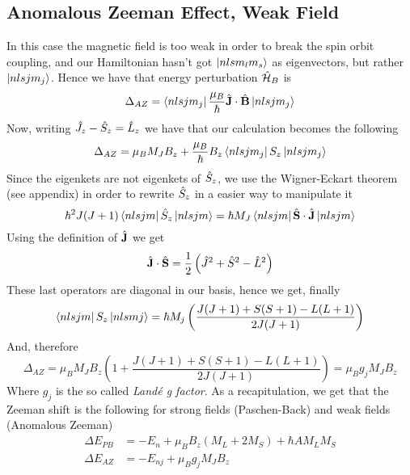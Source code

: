 \documentclass[../qm.tex]{subfiles}
\begin{document}
	\subsection{Anomalous Zeeman Effect, Weak Field}
	In this case the magnetic field is too weak in order to break the spin orbit coupling, and our Hamiltonian hasn't got $\ket{nlsm_lm_s}$ as eigenvectors, but rather $\ket{nlsjm_j}$. Hence we have that energy perturbation $\hat{\mathcal{H}}_B$ is
	\begin{equation*}
		\Delta_{AZ}=\bra{nlsjm_j}\frac{\mu_B}{\hbar}\hat{\mathbf{J}}\cdot\hat{\mathbf{B}}\ket{nlsjm_j}
	\end{equation*}
	Now, writing $\hat{J}_z-\hat{S}_z=\hat{L}_z$ we have that our calculation becomes the following
	\begin{equation*}
		\Delta_{AZ}=\mu_BM_JB_z+\frac{\mu_B}{\hbar}B_z\bra{nlsjm_j}S_z\ket{nlsjm_j}
	\end{equation*}
	Since the eigenkets are not eigenkets of $\hat{S}_z$, we use the Wigner-Eckart theorem (see appendix) in order to rewrite $\hat{S}_z$ in a easier way to manipulate it
	\begin{equation}
		\hbar^2J(J+1)\bra{nlsjm}\hat{S}_z\ket{nlsjm}=\hbar M_J\bra{nlsjm}\hat{\mathbf{S}}\cdot\hat{\mathbf{J}}\ket{nlsjm}
		\label{eq:wignereckart}
	\end{equation}
	Using the definition of $\hat{\mathbf{J}}$ we get
	\begin{equation*}
		\hat{\mathbf{J}}\cdot\hat{\mathbf{S}}=\frac{1}{2}\left( \hat{J}^2+\hat{S}^2-\hat{L}^2 \right)
	\end{equation*}
	These last operators are diagonal in our basis, hence we get, finally
	\begin{equation*}
		\bra{nlsjm}S_z\ket{nlsmj}=\hbar M_j\left( \frac{J(J+1)+S(S+1)-L(L+1)}{2J(J+1)} \right)
	\end{equation*}
	And, therefore
	\begin{equation}
		\Delta_{AZ}=\mu_BM_JB_z\left( 1+\frac{J(J+1)+S(S+1)-L(L+1)}{2J(J+1)} \right)=\mu_Bg_jM_JB_z
		\label{eq:anomalouszeemanshift1}
	\end{equation}
	Where $g_j$ is the so called \textit{Landé g factor}.
	As a recapitulation, we get that the Zeeman shift is the following for strong fields (Paschen-Back) and weak fields (Anomalous Zeeman)
	\begin{equation}
		\begin{aligned}
			\Delta E_{PB}&=-E_n+\mu_BB_z\left( M_L+2M_S \right)+\hbar AM_LM_S\\
			\Delta E_{AZ}&=-E_{nj}+\mu_Bg_jM_JB_z
		\end{aligned}
		\label{eq:zeemaneffecttot}
	\end{equation}
\end{document}
